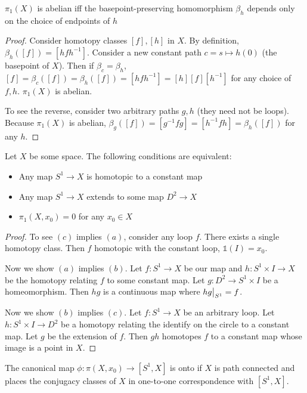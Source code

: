\documentclass[10pt]{article}
\newcommand\restr[2]{{%
  \left.\kern-\nulldelimiterspace %
  #1 %
  \vphantom{\big|} %
  \right|_{#2} %
}}
\begin{document}
\begin{exercise}[1.1.3]
	$\pi_1(X)$ is abelian iff the basepoint-preserving homomorphism $\beta_h$ depends only on the choice of endpoints of $h$
\end{exercise}

\begin{proof}

	Consider homotopy classes $[f], [h]$ in $X$. By definition, $\beta_h([f]) = [hfh^{-1}]$. Consider a new constant path $c = s \mapsto h(0)$ (the basepoint of $X$). Then if $\beta_c = \beta_h$, $[f] = \beta_c([f]) = \beta_h([f]) = [hfh^{-1}] = [h][f][h^{-1}]$ for any choice of $f, h$. $\pi_1(X)$ is abelian.

	To see the reverse, consider two arbitrary paths $g, h$ (they need not be loops). Because $\pi_1(X)$ is abelian, $\beta_g([f]) = [g^{-1}fg] = [h^{-1}fh] = \beta_h([f])$ for any $h$.

\end{proof}

\begin{exercise}[1.1.5]
	Let $X$ be some space. The following conditions are equivalent:
	\begin{itemize}
		\item{Any map $S^1 \to X$ is homotopic to a constant map}
		\item{Any map $S^1 \to X$ extends to some map $D^2 \to X$}
		\item{$\pi_1(X, x_0) = 0$ for any $x_0 \in X$}
	\end{itemize}
\end{exercise}

\begin{proof}
	To see $(c)$ implies $(a)$, consider any loop $f$. There exists a single homotopy class. Then $f$ homotopic with the constant loop, $\mathds{1}(I) = x_0$.
	\par Now we show $(a)$ implies $(b)$. Let $f: S^1 \to X$ be our map and $h: S^1 \times I \to X$ be the homotopy relating $f$ to some constant map. Let $g: D^2 \to S^1 \times I$ be a homeomorphism. Then $hg$ is a continuous map where $\restr{hg}{S^1} = f$.
	\par Now we show $(b)$ implies $(c)$. Let $f: S^1 \to X$ be an arbitrary loop. Let $h: S^1 \times I \to D^2$ be a homotopy relating the identify on the circle to a constant map. Let $g$ be the extension of $f$. Then $gh$ homotopes $f$ to a constant map whose image is a point in $X$.
\end{proof}

\begin{exercise}[1.1.6]
	The canonical map $\phi: \pi(X, x_0) \to [S^1, X]$ is onto if $X$ is path connected and places the conjugacy classes of $X$ in one-to-one correspondence with $[S^1, X]$.
\end{exercise}
\end{document}
